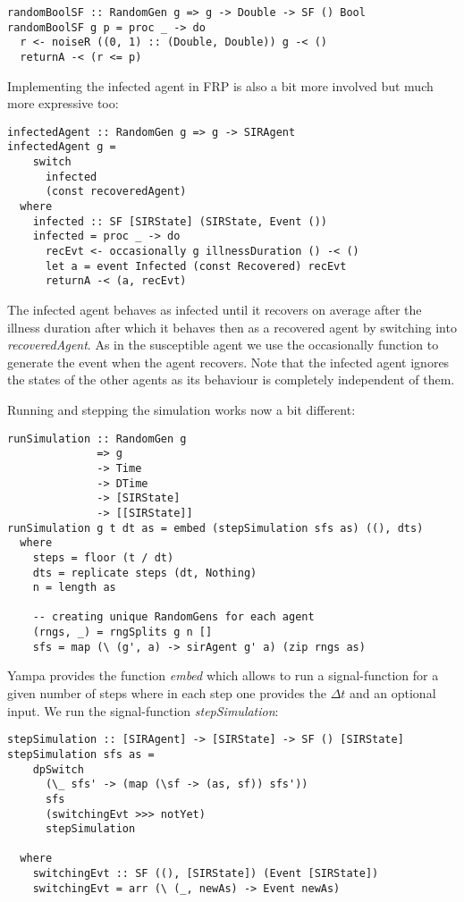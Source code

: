 \begin{verbatim}
randomBoolSF :: RandomGen g => g -> Double -> SF () Bool
randomBoolSF g p = proc _ -> do
  r <- noiseR ((0, 1) :: (Double, Double)) g -< ()
  returnA -< (r <= p)
\end{verbatim}

Implementing the infected agent in FRP is also a bit more involved but much more expressive too:

\begin{verbatim}
infectedAgent :: RandomGen g => g -> SIRAgent
infectedAgent g = 
    switch 
      infected 
      (const recoveredAgent)
  where
    infected :: SF [SIRState] (SIRState, Event ())
    infected = proc _ -> do
      recEvt <- occasionally g illnessDuration () -< ()
      let a = event Infected (const Recovered) recEvt
      returnA -< (a, recEvt)
\end{verbatim}

The infected agent behaves as infected until it recovers on average after the illness duration after which it behaves then as a recovered agent by switching into \textit{recoveredAgent}. As in the susceptible agent we use the occasionally function to generate the event when the agent recovers. Note that the infected agent ignores the states of the other agents as its behaviour is completely independent of them.

Running and stepping the simulation works now a bit different:

\begin{verbatim}
runSimulation :: RandomGen g 
              => g 
              -> Time 
              -> DTime 
              -> [SIRState] 
              -> [[SIRState]]
runSimulation g t dt as = embed (stepSimulation sfs as) ((), dts)
  where
    steps = floor (t / dt)
    dts = replicate steps (dt, Nothing)
    n = length as

	-- creating unique RandomGens for each agent
    (rngs, _) = rngSplits g n [] 
    sfs = map (\ (g', a) -> sirAgent g' a) (zip rngs as)
\end{verbatim}

Yampa provides the function \textit{embed} which allows to run a signal-function for a given number of steps where in each step one provides the $\Delta t$ and an optional input. We run the signal-function \textit{stepSimulation}:

\begin{verbatim}
stepSimulation :: [SIRAgent] -> [SIRState] -> SF () [SIRState]
stepSimulation sfs as =
    dpSwitch
      (\_ sfs' -> (map (\sf -> (as, sf)) sfs'))
      sfs
      (switchingEvt >>> notYet) 
      stepSimulation

  where
    switchingEvt :: SF ((), [SIRState]) (Event [SIRState])
    switchingEvt = arr (\ (_, newAs) -> Event newAs)
\end{verbatim}


